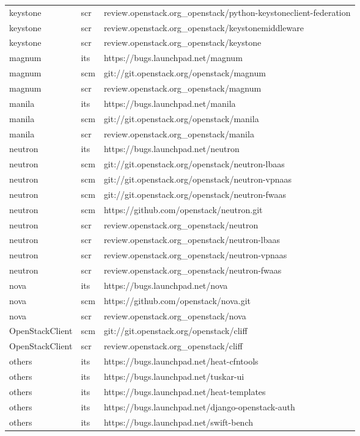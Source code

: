 \begin{center}
\begin{longtable}{|p{4cm}|p{1cm}|p{10cm}|}
keystone&scr&review.openstack.org\_openstack/python-keystoneclient-federation\\
keystone&scr&review.openstack.org\_openstack/keystonemiddleware\\
keystone&scr&review.openstack.org\_openstack/keystone\\
magnum&its&https://bugs.launchpad.net/magnum\\
magnum&scm&git://git.openstack.org/openstack/magnum\\
magnum&scr&review.openstack.org\_openstack/magnum\\
manila&its&https://bugs.launchpad.net/manila\\
manila&scm&git://git.openstack.org/openstack/manila\\
manila&scr&review.openstack.org\_openstack/manila\\
neutron&its&https://bugs.launchpad.net/neutron\\
neutron&scm&git://git.openstack.org/openstack/neutron-lbaas\\
neutron&scm&git://git.openstack.org/openstack/neutron-vpnaas\\
neutron&scm&git://git.openstack.org/openstack/neutron-fwaas\\
neutron&scm&https://github.com/openstack/neutron.git\\
neutron&scr&review.openstack.org\_openstack/neutron\\
neutron&scr&review.openstack.org\_openstack/neutron-lbaas\\
neutron&scr&review.openstack.org\_openstack/neutron-vpnaas\\
neutron&scr&review.openstack.org\_openstack/neutron-fwaas\\
nova&its&https://bugs.launchpad.net/nova\\
nova&scm&https://github.com/openstack/nova.git\\
nova&scr&review.openstack.org\_openstack/nova\\
OpenStackClient&scm&git://git.openstack.org/openstack/cliff\\
OpenStackClient&scr&review.openstack.org\_openstack/cliff\\
others&its&https://bugs.launchpad.net/heat-cfntools\\
others&its&https://bugs.launchpad.net/tuskar-ui\\
others&its&https://bugs.launchpad.net/heat-templates\\
others&its&https://bugs.launchpad.net/django-openstack-auth\\
others&its&https://bugs.launchpad.net/swift-bench\\

\end{longtable}
\end{center}
